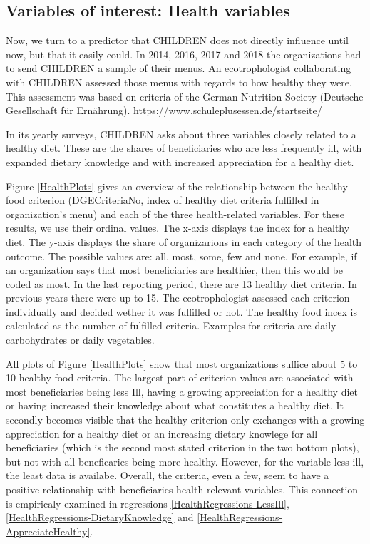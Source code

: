 \documentclass[12pt, a4paper, titlepage]{article}\usepackage[]{graphicx}\usepackage[]{color}
\begin{document}
\subsection{Variables of interest: Health variables} 

Now, we turn to a predictor that CHILDREN does not directly influence until now, but that it easily could. In 2014, 2016, 2017 and 2018 the organizations had to send CHILDREN a sample of their menus. An ecotrophologist collaborating with CHILDREN assessed those menus with regards to how healthy they were. This assessment was based on criteria of the German Nutrition Society (Deutsche Gesellschaft für Ernährung). https://www.schuleplusessen.de/startseite/

In its yearly surveys, CHILDREN asks about three variables closely related to a healthy diet. These are the shares of beneficiaries who are less frequently ill, with expanded dietary knowledge and with increased appreciation for a healthy diet. 

Figure \ref{HealthPlots} gives an overview of the relationship between the healthy food criterion (DGECriteriaNo, index of healthy diet criteria fulfilled in organization's menu) and each of the three health-related variables. For these results, we use their ordinal values. The x-axis displays the index for a healthy diet. The y-axis displays the share of organizarions in each category of the health outcome. The possible values are: all, most, some, few and none. For example, if an organization says that most beneficiaries are healthier, then this would be coded as most. In the last reporting period, there are 13 healthy diet criteria. In previous years there were up to 15. The ecotrophologist assessed each criterion individually and decided wether it was fulfilled or not. The healthy food incex is calculated as the number of fulfilled criteria. Examples for criteria are daily carbohydrates or daily vegetables.  

All plots of Figure \ref{HealthPlots} show that most organizations suffice about 5 to 10 healthy food criteria. The largest part of criterion values are associated with most beneficiaries being less Ill, having a growing appreciation for a healthy diet or having increased their knowledge about what constitutes a healthy diet. It secondly becomes visible that the healthy criterion only exchanges with a growing appreciation for a healthy diet or an increasing dietary knowlege for all beneficiaries (which is the second most stated criterion in the two bottom plots), but not with all beneficaries being more healthy. However, for the variable less ill, the least data is availabe. Overall, the criteria, even a few, seem to have a positive relationship with beneficiaries health relevant variables. This connection is empiricaly examined in regressions \ref{HealthRegressions-LessIll}, \ref{HealthRegressions-DietaryKnowledge} and \ref{HealthRegressions-AppreciateHealthy}.
\end{document}

